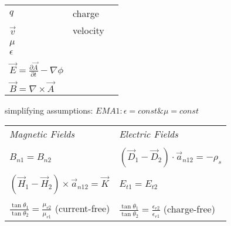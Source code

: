 \begin{textblock*}{190.5mm}
\begin{tabular}{lll}
    $q$        & charge                  & \\
    $\vec v$   & velocity                & \\
    $\mu$      &             & \\
    $\epsilon$ &             & \\
               &                         & \\
    ${\vec E} = \frac{\partial \vec A}{\partial t} - \nabla \phi$ & & \\
    ${\vec B} = \nabla \times {\vec A}$ & & \\
\end{tabular}
\vspace{10mm}
simplifying assumptions:  $EMA1:  \epsilon = const \& \mu = const$

\begin{tabular}{ll}
  \emph{Magnetic Fields}                                                                     &
  \emph{Electric Fields}                                                                     \\
                                                                                             &
                                                                                             \\
  $B_{n1} = B_{n2}$                                                                          & 
  $\left( {\vec D}_1 - {\vec D}_2 \right) \cdot {\vec a}_{n12} = - \rho_s$                   \\
                                                                                             &
                                                                                             \\
  $\left( {\vec H}_1 - {\vec H}_2 \right) \times {\vec a}_{n12}  = {\vec K}$                 &
  $E_{t1} = E_{t2}$                                                                          \\
                                                                                             &
                                                                                             \\
  $\frac{\tan \theta_1}{\tan \theta_2} = \frac{\mu_{r2}}     {\mu_{r1}}$      (current-free) &
  $\frac{\tan \theta_1}{\tan \theta_2} = \frac{\epsilon_{r2}}{\epsilon_{r1}}$ (charge-free)  \\
\end{tabular}
\end{textblock*}